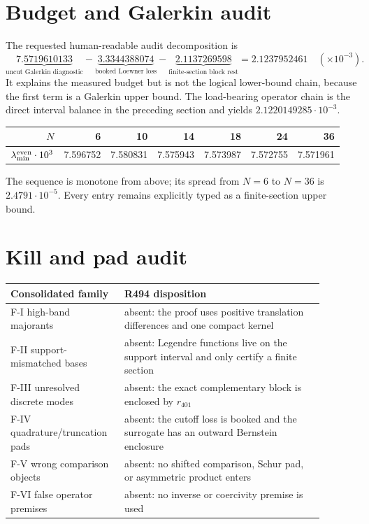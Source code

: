 \documentclass[11pt]{article}
\begin{document}
\section{Budget and Galerkin audit}

The requested human-readable audit decomposition is
\[
\underbrace{7.5719610133}_{\text{uncut Galerkin diagnostic}}
-\underbrace{3.3344388074}_{\text{booked Loewner loss}}
-\underbrace{2.1137269598}_{\text{finite-section block rest}}
=2.1237952461
\quad(\times10^{-3}).
\]
It explains the measured budget but is not the logical lower-bound
chain, because the first term is a Galerkin upper bound.  The
load-bearing operator chain is the direct interval balance in the
preceding section and yields $2.1220149285\cdot10^{-3}$.

\begin{center}
\small
\begin{tabular}{@{}rrrrrrr@{}}
\toprule
$N$ & 6 & 10 & 14 & 18 & 24 & 36\\
\midrule
$\lambda_{\min}^{\rm even}\cdot10^3$
&7.596752&7.580831&7.575943&7.573987&7.572755&7.571961\\
\bottomrule
\end{tabular}
\end{center}
The sequence is monotone from above; its spread from $N=6$ to
$N=36$ is $2.4791\cdot10^{-5}$.  Every entry remains explicitly
typed as a finite-section upper bound.

\section{Kill and pad audit}

\begin{center}
\small
\begin{tabular}{@{}p{0.30\linewidth}p{0.59\linewidth}@{}}
\toprule
Consolidated family & R494 disposition\\
\midrule
F-I high-band majorants & absent: the proof uses positive translation
differences and one compact kernel\\
F-II support-mismatched bases & absent: Legendre functions live on the
support interval and only certify a finite section\\
F-III unresolved discrete modes & absent: the exact complementary
block is enclosed by $r_{401}$\\
F-IV quadrature/truncation pads & absent: the cutoff loss is booked and
the surrogate has an outward Bernstein enclosure\\
F-V wrong comparison objects & absent: no shifted comparison,
Schur pad, or asymmetric product enters\\
F-VI false operator premises & absent: no inverse or coercivity premise
is used\\
\bottomrule
\end{tabular}
\end{center}
\end{document}
